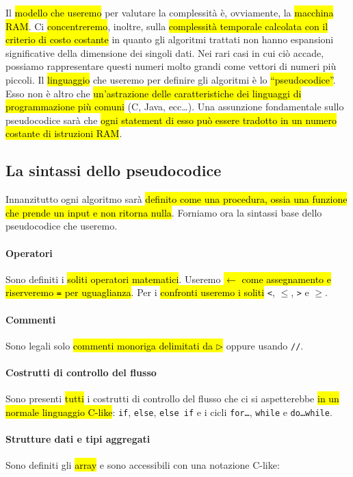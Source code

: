 \documentclass[a4paper,11pt,oneside]{article}
\theoremstyle{plain}
\theoremstyle{definition}
\theoremstyle{remark}
\newcommand{\peq}{$\gets$}
\newcommand{\pcom}{$\triangleright$}
\begin{document}
Il \hl{modello che useremo} per valutare la complessità è, ovviamente, la
\hl{macchina RAM}\@. Ci \hl{concentreremo}, inoltre, sulla \hl{complessità
temporale calcolata con il criterio di costo costante} in quanto gli algoritmi
trattati non hanno espansioni significative della dimensione dei singoli dati.
Nei rari casi in cui ciò accade, possiamo rappresentare questi numeri molto
grandi come vettori di numeri più piccoli. Il \hl{linguaggio} che useremo per
definire gli algoritmi è lo \hl{``pseudocodice''}. Esso non è altro che
\hl{un'astrazione delle caratteristiche dei linguaggi di programmazione più
comuni} (C, Java, ecc\dots). Una assunzione fondamentale sullo pseudocodice sarà
che \hl{ogni statement di esso può essere tradotto in un numero costante di
istruzioni RAM}\@.

\subsection{La sintassi dello pseudocodice}\label{sec:syntax-pseudocodice}

Innanzitutto ogni algoritmo sarà \hl{definito come una procedura, ossia una
funzione che prende un input e non ritorna nulla}. Forniamo ora la sintassi base
dello pseudocodice che useremo.

\paragraph{Operatori} Sono definiti i \hl{soliti operatori matematici}. Useremo
\hl{\peq{} come assegnamento e riserveremo \texttt{=} per uguaglianza}. Per i
\hl{confronti useremo i soliti} \texttt{<}, $\leq$, \texttt{>} e $\geq$.

\paragraph{Commenti} Sono legali solo \hl{commenti monoriga delimitati da
\pcom{}} oppure usando \texttt{//}.

\paragraph{Costrutti di controllo del flusso} Sono presenti \hl{tutti} i
costrutti di controllo del flusso che ci si aspetterebbe \hl{in un normale
linguaggio C-like}: \texttt{if}, \texttt{else}, \texttt{else if} e i cicli
\texttt{for\dots}, \texttt{while} e \texttt{do\dots while}.

\paragraph{Strutture dati e tipi aggregati} Sono definiti gli \hl{array} e sono
accessibili con una notazione C-like:
\end{document}
